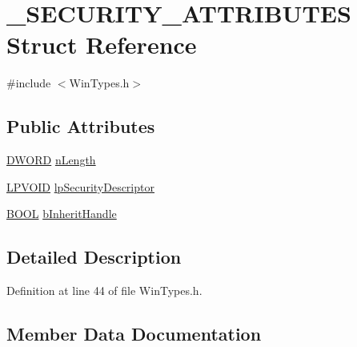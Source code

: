 \hypertarget{struct__SECURITY__ATTRIBUTES}{}\section{\+\_\+\+S\+E\+C\+U\+R\+I\+T\+Y\+\_\+\+A\+T\+T\+R\+I\+B\+U\+T\+ES Struct Reference}
\label{struct__SECURITY__ATTRIBUTES}


{\ttfamily \#include $<$Win\+Types.\+h$>$}

\subsection*{Public Attributes}
\begin{DoxyCompactItemize}
\item 
\hyperlink{CatCaloProto40MHz_2inc_2WinTypes_8h_ad342ac907eb044443153a22f964bf0af}{D\+W\+O\+RD} \hyperlink{struct__SECURITY__ATTRIBUTES_a3ec25c40b65a92b164177b0b230abda9}{n\+Length}
\item 
\hyperlink{CatCaloProto40MHz_2inc_2WinTypes_8h_a98428a03b263db9d26c25c53459c542f}{L\+P\+V\+O\+ID} \hyperlink{struct__SECURITY__ATTRIBUTES_a90d1d49f7d2d50b24cc74c5060ae6204}{lp\+Security\+Descriptor}
\item 
\hyperlink{CatCaloProto40MHz_2inc_2WinTypes_8h_a050c65e107f0c828f856a231f4b4e788}{B\+O\+OL} \hyperlink{struct__SECURITY__ATTRIBUTES_a8d91cd71bb0dfe51061c2412849dff98}{b\+Inherit\+Handle}
\end{DoxyCompactItemize}


\subsection{Detailed Description}


Definition at line 44 of file Win\+Types.\+h.



\subsection{Member Data Documentation}
\mbox{\label{struct__SECURITY__ATTRIBUTES_a8d91cd71bb0dfe51061c2412849dff98}} 
